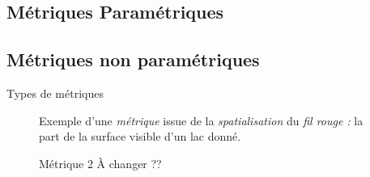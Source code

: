 \subsection{Métriques Paramétriques}

\subsection{Métriques non paramétriques}

\begin{table}
  \centering
  
  \caption{Types de métriques}
  \label{fig:type_metriques}
\end{table}


\begin{figure}
  \centering
  
  \caption{Exemple d'une \emph{métrique} issue de la
    \emph{spatialisation} du \emph{fil rouge :} la part de la surface
    visible d'un lac donné.}
  \label{fig:metrique_part_lac}
\end{figure}


\begin{figure}
  \centering
  
  \caption{Métrique 2 À  changer ??}
\end{figure}

